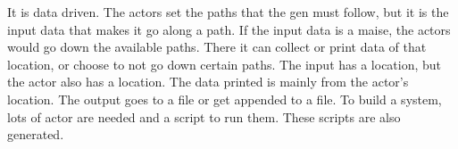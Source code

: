 It is data driven. The actors set the paths that the gen must follow,
but it is the input data that makes it go along a path. If the input
data is a maise, the actors would go down the available paths. There it
can collect or print data of that location, or choose to not go down
certain paths. The input has a location, but the actor also has a
location. The data printed is mainly from the actor's location. The
output goes to a file or get appended to a file. To build a system, lots
of actor are needed and a script to run them. These scripts are also
generated.
